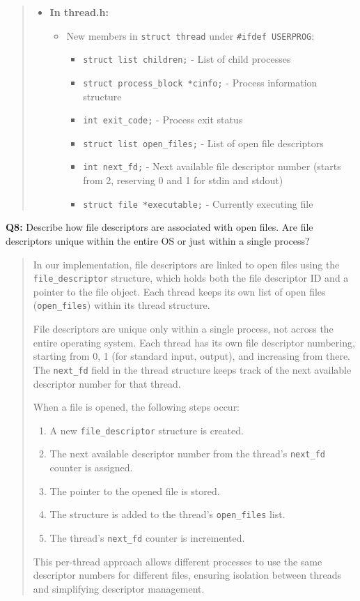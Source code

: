 \documentclass[a4paper,11pt]{paper}
\begin{document}
\begin{quote}
\begin{itemize}
\item \textbf{In thread.h:}
  \begin{itemize}
  \item New members in \texttt{struct thread} under \texttt{\#ifdef USERPROG}:
     \begin{itemize}
     \item \texttt{struct list children;} - List of child processes
     \item \texttt{struct process\_block *cinfo;} - Process information structure
     \item \texttt{int exit\_code;} - Process exit status
     \item \texttt{struct list open\_files;} - List of open file descriptors
     \item \texttt{int next\_fd;} - Next available file descriptor number (starts from 2, reserving 0 and 1 for stdin and stdout)
     \item \texttt{struct file *executable;} - Currently executing file
     \end{itemize}
  \end{itemize}
\end{itemize}
\end{quote}

\newpage
\textbf{Q8:} Describe how file descriptors are associated with open files. Are file descriptors unique within the entire OS or just within a single process?
\begin{quote}
In our implementation, file descriptors are linked to open files using the \texttt{file\_descriptor} structure, which holds both the file descriptor ID and a pointer to the file object. Each thread keeps its own list of open files (\texttt{open\_files}) within its thread structure.

File descriptors are unique only within a single process, not across the entire operating system. Each thread has its own file descriptor numbering, starting from 0, 1 (for standard input, output), and increasing from there. The \texttt{next\_fd} field in the thread structure keeps track of the next available descriptor number for that thread.

When a file is opened, the following steps occur:
\begin{enumerate}
    \item A new \texttt{file\_descriptor} structure is created.
    \item The next available descriptor number from the thread's \texttt{next\_fd} counter is assigned.
    \item The pointer to the opened file is stored.
    \item The structure is added to the thread's \texttt{open\_files} list.
    \item The thread's \texttt{next\_fd} counter is incremented.
\end{enumerate}

This per-thread approach allows different processes to use the same descriptor numbers for different files, ensuring isolation between threads and simplifying descriptor management.
\end{quote}
\end{document}
